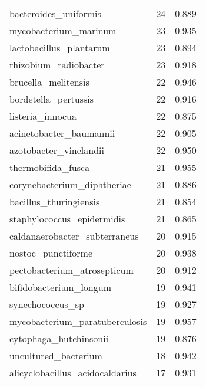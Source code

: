 \begin{tabular}{lrr}
                       bacteroides\_uniformis &                  24 &     0.889 \\
                       mycobacterium\_marinum &                  23 &     0.935 \\
                     lactobacillus\_plantarum &                  23 &     0.894 \\
                       rhizobium\_radiobacter &                  23 &     0.918 \\
                         brucella\_melitensis &                  22 &     0.946 \\
                        bordetella\_pertussis &                  22 &     0.916 \\
                            listeria\_innocua &                  22 &     0.875 \\
                     acinetobacter\_baumannii &                  22 &     0.905 \\
                      azotobacter\_vinelandii &                  22 &     0.950 \\
                          thermobifida\_fusca &                  21 &     0.955 \\
                 corynebacterium\_diphtheriae &                  21 &     0.886 \\
                      bacillus\_thuringiensis &                  21 &     0.854 \\
                  staphylococcus\_epidermidis &                  21 &     0.865 \\
               caldanaerobacter\_subterraneus &                  20 &     0.915 \\
                          nostoc\_punctiforme &                  20 &     0.938 \\
                 pectobacterium\_atrosepticum &                  20 &     0.912 \\
                      bifidobacterium\_longum &                  19 &     0.941 \\
                            synechococcus\_sp &                  19 &     0.927 \\
              mycobacterium\_paratuberculosis &                  19 &     0.957 \\
                      cytophaga\_hutchinsonii &                  19 &     0.876 \\
                        uncultured\_bacterium &                  18 &     0.942 \\
             alicyclobacillus\_acidocaldarius &                  17 &     0.931 \\

\end{tabular}
